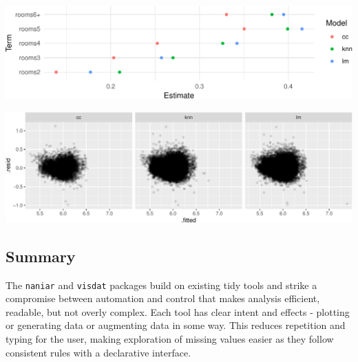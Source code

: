 \documentclass[]{article}
\let\origfigure\figure
\let\endorigfigure\endfigure
\renewenvironment{figure}[1][2] {
    \expandafter\origfigure\expandafter[H]
} {
    \endorigfigure
}
\theoremstyle{definition}
\theoremstyle{definition}
\theoremstyle{definition}
\theoremstyle{remark}
\begin{document}
\begin{figure}

{\centering \includegraphics[width=1\linewidth]{tidy-missing-data-paper_files/figure-latex/tidy-coefs-1} 

}

\caption{Visualization of the variation in coefficients for linear model of log price for each of the different datasets for the number of rooms. In red is complete case (cc), in green is the knn imputed dataset, and in blue the imputed by linear model. Using the complete case dataset produced smaller coefficients compared to the imputed models.}\label{fig:tidy-coefs}
\end{figure}

\begin{figure}

{\centering \includegraphics[width=1\linewidth]{tidy-missing-data-paper_files/figure-latex/partial-resid-1} 

}

\caption{Partial residual plot for each data set, complete cases (cc), imputed with KNN (knn), and imputed with a linear model (lm). There is not much variation amongst the different datasets from the different imputation methods.}\label{fig:partial-resid}
\end{figure}

\hypertarget{case-study-summary}{%
\subsection{Summary}\label{case-study-summary}}

The \texttt{naniar} and \texttt{visdat} packages build on existing tidy
tools and strike a compromise between automation and control that makes
analysis efficient, readable, but not overly complex. Each tool has
clear intent and effects - plotting or generating data or augmenting
data in some way. This reduces repetition and typing for the user,
making exploration of missing values easier as they follow consistent
rules with a declarative interface.
\end{document}
